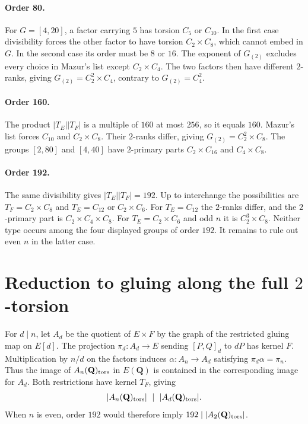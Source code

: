 \documentclass[11pt]{article}
\begin{document}
\paragraph{Order 80.} For $G=[4,20]$, a factor carrying $5$ has torsion $C_5$ or $C_{10}$. In the first case divisibility forces the other factor to have torsion $C_2\times C_8$, which cannot embed in $G$. In the second case its order must be $8$ or $16$. The exponent of $G_{(2)}$ excludes every choice in Mazur's list except $C_2\times C_4$. The two factors then have different $2$-ranks, giving $G_{(2)}=C_2^2\times C_4$, contrary to $G_{(2)}=C_4^2$.

\paragraph{Order 160.} The product $|T_E||T_F|$ is a multiple of $160$ at most $256$, so it equals $160$. Mazur's list forces $C_{10}$ and $C_2\times C_8$. Their $2$-ranks differ, giving $G_{(2)}=C_2^2\times C_8$. The groups $[2,80]$ and $[4,40]$ have $2$-primary parts $C_2\times C_{16}$ and $C_4\times C_8$.

\paragraph{Order 192.} The same divisibility gives $|T_E||T_F|=192$. Up to interchange the possibilities are $T_F=C_2\times C_8$ and $T_E=C_{12}$ or $C_2\times C_6$. For $T_E=C_{12}$ the $2$-ranks differ, and the $2$-primary part is $C_2\times C_4\times C_8$. For $T_E=C_2\times C_6$ and odd $n$ it is $C_2^3\times C_8$. Neither type occurs among the four displayed groups of order $192$. It remains to rule out even $n$ in the latter case.

\section*{Reduction to gluing along the full $2$-torsion}
For $d\mid n$, let $A_d$ be the quotient of $E\times F$ by the graph of the restricted gluing map on $E[d]$. The projection $\pi_d:A_d\to E$ sending $[P,Q]_d$ to $dP$ has kernel $F$. Multiplication by $n/d$ on the factors induces $\alpha:A_n\to A_d$ satisfying $\pi_d\alpha=\pi_n$. Thus the image of $A_n(\mathbf Q)_{\rm tors}$ in $E(\mathbf Q)$ is contained in the corresponding image for $A_d$. Both restrictions have kernel $T_F$, giving
\[
 |A_n(\mathbf Q)_{\rm tors}|\ \mid\ |A_d(\mathbf Q)_{\rm tors}|.
\]
When $n$ is even, order $192$ would therefore imply $192\mid |A_2(\mathbf Q)_{\rm tors}|$.
\end{document}
